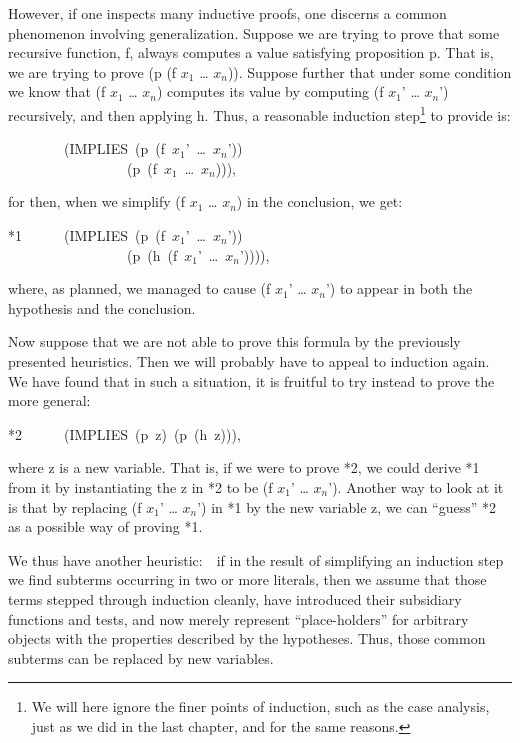 \documentclass[11pt]{book}
\newenvironment{pubasis}{\begin{flushleft}\ttfamily\small}{\normalsize\rmfamily\end{flushleft}}
\begin{document}
However, if one inspects many inductive proofs, one discerns a common phenomenon
involving generalization.
Suppose we are trying to prove that some recursive function, f,
always computes a value satisfying proposition p.  That is, we are trying to
prove (p (f $x_{1}$ \ldots{} $x_{n}$)).   Suppose further that under some condition we know that
(f $x_{1}$ \ldots{} $x_{n}$) computes its value by computing (f $x_{1}$' \ldots{} $x_{n}$') recursively, and then
applying h.  Thus, a reasonable induction step\footnote{We will here ignore the finer points of induction, such as the case analysis, just as we did in the last chapter, and for the same reasons.}
 to provide is:
\begin{pubasis}
~~~~~~~~(IMPLIES~(p~(f~$x_{1}$'~\ldots{}~$x_{n}$'))\\
~~~~~~~~~~~~~~~~~(p~(f~$x_{1}$~\ldots{}~$x_{n}$))),\\
\end{pubasis}
for then, when we simplify (f $x_{1}$ \ldots{} $x_{n}$) in the conclusion, we
get:
\begin{pubasis}
*1~~~~~~(IMPLIES~(p~(f~$x_{1}$'~\ldots{}~$x_{n}$'))\\
~~~~~~~~~~~~~~~~~(p~(h~(f~$x_{1}$'~\ldots{}~$x_{n}$')))),\\
\end{pubasis}
where, as planned, we managed to cause (f $x_{1}$' \ldots{} $x_{n}$') to appear in 
both the
hypothesis and the conclusion. 

Now suppose that we are not able to prove this formula
by the previously presented heuristics.  Then we will
probably have to appeal to induction again.  We have found
that in such a situation, it is fruitful to
try instead to prove the more general:
\begin{pubasis}
*2~~~~~~(IMPLIES~(p~z)~(p~(h~z))),\\
\end{pubasis}
where z is a new variable.  That is, if we were to prove *2, we could  derive *1 from it
by instantiating the z in *2 to be (f $x_{1}$' \ldots{} $x_{n}$').
Another way to look at it is that by replacing
(f $x_{1}$' \ldots{} $x_{n}$') in *1 by the new variable z,
we can ``guess'' *2 as a possible way
of proving *1.

We thus have  another heuristic:~~if in the result
of simplifying an induction step we find subterms occurring in two or
more literals, then we assume that those terms
stepped through induction cleanly, have introduced their subsidiary
functions and tests, and now merely represent ``place-holders'' for
arbitrary objects with the properties described by the hypotheses.
Thus, those common subterms can be replaced by new variables.
\end{document}
